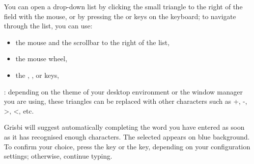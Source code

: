 You can open a drop-down list by clicking the small triangle to the right of the field with the mouse, or by pressing the  or \keys{\arrowkeydown} keys on the keyboard; to navigate through the list, you can use:
\begin{itemize}
	\item the mouse and the scrollbar to the right of the list,
	\item the mouse wheel,
	\item the , , \keys{\arrowkeyup} or \keys{\arrowkeydown} keys,
\end{itemize}
	

\Note{}: depending on the theme of your desktop environment or the window manager you are using, these triangles can be replaced with other characters such as +, -, >, <, etc.

Grisbi will suggest automatically completing the word you have entered as soon as it has recognised enough characters. The selected  appears on \colorbox[RGB]{61,174,233}{blue background}. To confirm your choice, press the  key or the  key, depending on your configuration settings; otherwise, continue typing.

